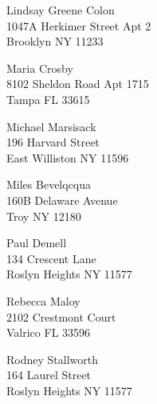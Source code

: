 \documentclass{article}
\begin{document}
\begin{center}
\begin{Huge}
\clearpage

\vspace*{\fill}
Lindsay Greene Colon\\
1047A Herkimer Street Apt 2\\
Brooklyn NY 11233\\
\vspace{\fill}

\clearpage

\vspace*{\fill}
Maria Crosby\\
8102 Sheldon Road Apt 1715\\
Tampa FL 33615\\
\vspace{\fill}

\clearpage

\vspace*{\fill}
Michael Marsisack\\
196 Harvard Street\\
East Williston NY 11596\\
\vspace{\fill}

\clearpage

\vspace*{\fill}
Miles Bevelqcqua\\
160B Delaware Avenue\\
Troy NY 12180\\
\vspace{\fill}

\clearpage

\vspace*{\fill}
Paul Demell\\
134 Crescent Lane\\
Roslyn Heights NY 11577\\
\vspace{\fill}

\clearpage

\vspace*{\fill}
Rebecca Maloy\\
2102 Crestmont Court\\
Valrico FL 33596\\
\vspace{\fill}

\clearpage

\vspace*{\fill}
Rodney Stallworth\\
164 Laurel Street\\
Roslyn Heights NY 11577\\
\vspace{\fill}


\end{Huge}
\end{center}
\end{document}

